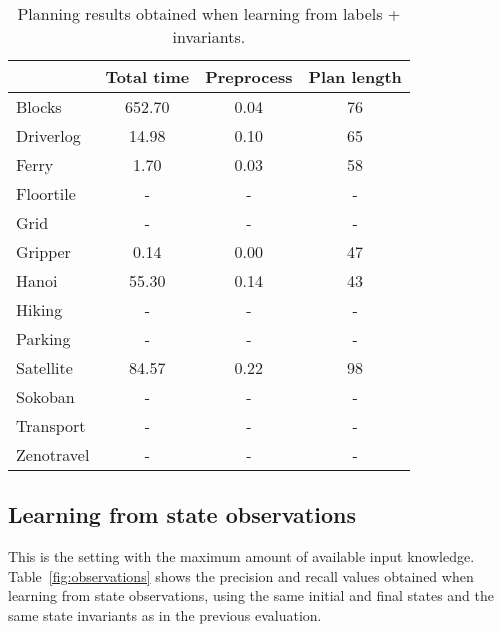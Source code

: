\documentclass{article}
\begin{document}
\begin{table}
	\begin{footnotesize}
		\begin{center}
			\begin{tabular}{l|c|c|c|}			
				& Total time & Preprocess & Plan length  \\
				\hline
				Blocks & 652.70 & 0.04 & 76  \\
				Driverlog & 14.98 & 0.10 & 65 \\
				Ferry & 1.70 & 0.03 & 58 \\
				Floortile & - & - & - \\ %
				Grid & - & - & - \\ %
				Gripper & 0.14 & 0.00 & 47 \\
				Hanoi & 55.30 & 0.14 & 43  \\
				Hiking & - & - & - \\ %
				Parking & - & - & - \\ %
				Satellite & 84.57 & 0.22 & 98 \\
				Sokoban & - & - & - \\ %
				Transport & - & - & - \\ %
				Zenotravel & - & - & - \\ %
			\end{tabular}
		\end{center}
	\end{footnotesize}	
 \caption{\small Planning results obtained when learning from labels + invariants.}
\label{fig:planinvariants}
\end{table}


\subsection{Learning from state observations}
This is the setting with the maximum amount of available input knowledge. Table~\ref{fig:observations} shows the precision and recall values obtained when learning from state observations, using the same initial and  final states and the same state invariants as in the previous evaluation. 
\end{document}
